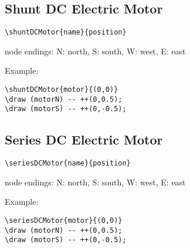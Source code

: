 \documentclass[parskip=full]{scrartcl}
\begin{document}
\subsection{Shunt DC Electric Motor}

\begin{verbatim}
\shuntDCMotor{name}{position}
\end{verbatim}
node endings: N: north, S: south, W: west, E: east

Example:\\
\begin{minipage}{0.8\textwidth}
\begin{verbatim}
\shuntDCMotor{motor}{(0,0)}
\draw (motorN) -- ++(0,0.5);
\draw (motorS) -- ++(0,-0.5);
\end{verbatim}
\end{minipage}
\begin{minipage}{0.19\textwidth}
\end{minipage}

\subsection{Series DC Electric Motor}

\begin{verbatim}
\seriesDCMotor{name}{position}
\end{verbatim}
node endings: N: north, S: south, W: west, E: east

Example:\\
\begin{minipage}{0.8\textwidth}
\begin{verbatim}
\seriesDCMotor{motor}{(0,0)}
\draw (motorN) -- ++(0,0.5);
\draw (motorS) -- ++(0,-0.5);
\end{verbatim}
\end{minipage}
\begin{minipage}{0.19\textwidth}
\end{minipage}
\end{document}
